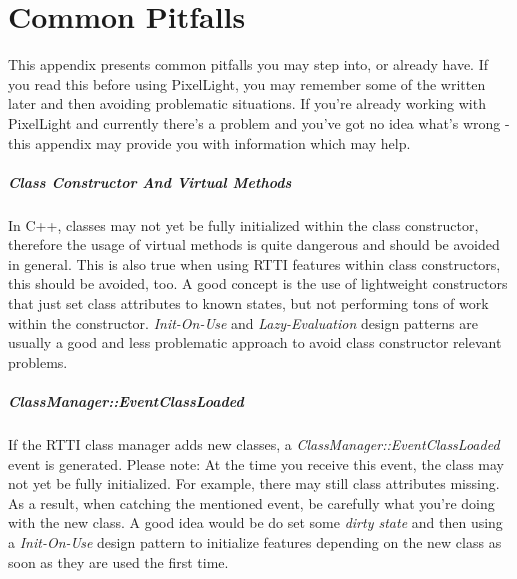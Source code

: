 \chapter{Common Pitfalls}
\label{Appendix:CommonPitfalls}
This appendix presents common pitfalls you may step into, or already have. If you read this before using PixelLight, you may remember some of the written later and then avoiding problematic situations. If you're already working with PixelLight and currently there's a problem and you've got no idea what's wrong - this appendix may provide you with information which may help.


\paragraph{Class Constructor And Virtual Methods}
In C++, classes may not yet be fully initialized within the class constructor, therefore the usage of virtual methods is quite dangerous and should be avoided in general. This is also true when using RTTI features within class constructors, this should be avoided, too. A good concept is the use of lightweight constructors that just set class attributes to known states, but not performing tons of work within the constructor. \emph{Init-On-Use} and \emph{Lazy-Evaluation} design patterns are usually a good and less problematic approach to avoid class constructor relevant problems.


\paragraph{ClassManager::EventClassLoaded}
If the RTTI class manager adds new classes, a \emph{ClassManager::EventClassLoaded} event is generated. Please note: At the time you receive this event, the class may not yet be fully initialized. For example, there may still class attributes missing. As a result, when catching the mentioned event, be carefully what you're doing with the new class. A good idea would be do set some \emph{dirty state} and then using a \emph{Init-On-Use} design pattern to initialize features depending on the new class as soon as they are used the first time.


